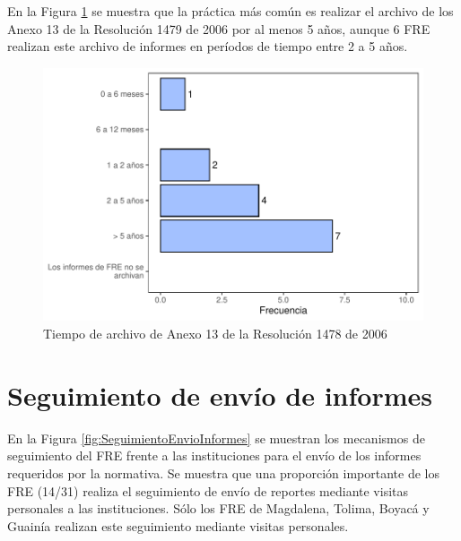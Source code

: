\documentclass[
]{book}
\begin{document}
En la Figura \ref{fig:ArchivoInformesFRE} se muestra que la práctica más común es realizar el archivo de los Anexo 13 de la Resolución 1479 de 2006 por al menos 5 años, aunque 6 FRE realizan este archivo de informes en períodos de tiempo entre 2 a 5 años.

\begin{figure}

{\centering \includegraphics[width=0.85\linewidth]{InformeFinal_files/figure-latex/ArchivoInformesFRE-1} 

}

\caption{Tiempo de archivo de Anexo 13 de la Resolución 1478 de 2006}\label{fig:ArchivoInformesFRE}
\end{figure}

\hypertarget{seguimiento-de-envuxedo-de-informes}{%
\section{Seguimiento de envío de informes}\label{seguimiento-de-envuxedo-de-informes}}

En la Figura \ref{fig:SeguimientoEnvioInformes} se muestran los mecanismos de seguimiento del FRE frente a las instituciones para el envío de los informes requeridos por la normativa. Se muestra que una proporción importante de los FRE (14/31) realiza el seguimiento de envío de reportes mediante visitas personales a las instituciones. Sólo los FRE de Magdalena, Tolima, Boyacá y Guainía realizan este seguimiento mediante visitas personales.
\end{document}
